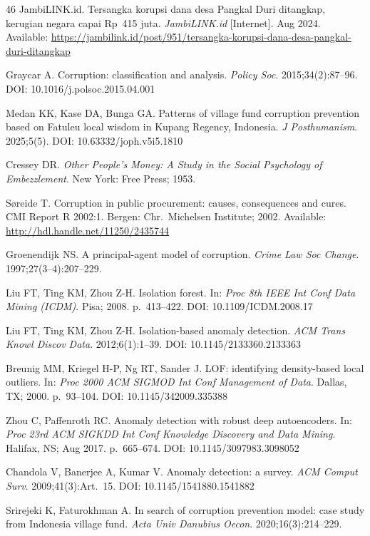\documentclass[3p,times,procedia]{elsarticle}
\begin{document}
\begin{thebibliography}{46}
JambiLINK.id. Tersangka korupsi dana desa Pangkal Duri ditangkap, kerugian negara capai Rp~415 juta. \textit{JambiLINK.id} [Internet]. Aug 2024. Available: \url{https://jambilink.id/post/951/tersangka-korupsi-dana-desa-pangkal-duri-ditangkap}

Graycar A. Corruption: classification and analysis. \textit{Policy Soc}. 2015;34(2):87--96. DOI: 10.1016/j.polsoc.2015.04.001

Medan KK, Kase DA, Bunga GA. Patterns of village fund corruption prevention based on Fatuleu local wisdom in Kupang Regency, Indonesia. \textit{J Posthumanism}. 2025;5(5). DOI: 10.63332/joph.v5i5.1810

Cressey DR. \textit{Other People's Money: A Study in the Social Psychology of Embezzlement}. New York: Free Press; 1953.

S{\o}reide T. Corruption in public procurement: causes, consequences and cures. CMI Report R 2002:1. Bergen: Chr.\ Michelsen Institute; 2002. Available: \url{http://hdl.handle.net/11250/2435744}

Groenendijk NS. A principal-agent model of corruption. \textit{Crime Law Soc Change}. 1997;27(3--4):207--229.

Liu FT, Ting KM, Zhou Z-H. Isolation forest. In: \textit{Proc 8th IEEE Int Conf Data Mining (ICDM)}. Pisa; 2008. p.\ 413--422. DOI: 10.1109/ICDM.2008.17

Liu FT, Ting KM, Zhou Z-H. Isolation-based anomaly detection. \textit{ACM Trans Knowl Discov Data}. 2012;6(1):1--39. DOI: 10.1145/2133360.2133363

Breunig MM, Kriegel H-P, Ng RT, Sander J. LOF: identifying density-based local outliers. In: \textit{Proc 2000 ACM SIGMOD Int Conf Management of Data}. Dallas, TX; 2000. p.\ 93--104. DOI: 10.1145/342009.335388

Zhou C, Paffenroth RC. Anomaly detection with robust deep autoencoders. In: \textit{Proc 23rd ACM SIGKDD Int Conf Knowledge Discovery and Data Mining}. Halifax, NS; Aug 2017. p.\ 665--674. DOI: 10.1145/3097983.3098052

Chandola V, Banerjee A, Kumar V. Anomaly detection: a survey. \textit{ACM Comput Surv}. 2009;41(3):Art.~15. DOI: 10.1145/1541880.1541882

Srirejeki K, Faturokhman A. In search of corruption prevention model: case study from Indonesia village fund. \textit{Acta Univ Danubius Oecon}. 2020;16(3):214--229.


\end{thebibliography}
\end{document}
